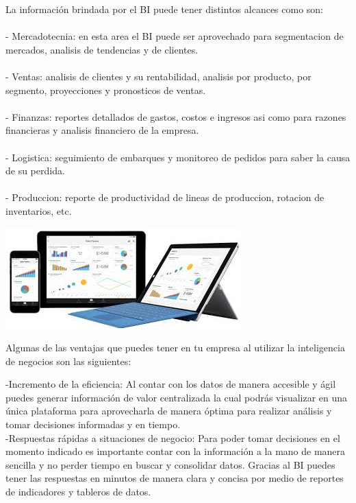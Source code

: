 \begin{enumerate}[2.]
La información brindada por el BI puede tener distintos alcances como son:\\
\\- Mercadotecnia: en esta area el BI puede ser aprovechado para segmentacion de mercados, analisis de tendencias y de clientes.\\
\\- Ventas: analisis de clientes y su rentabilidad, analisis por producto, por segmento, proyecciones y pronosticos de ventas.\\
\\- Finanzas: reportes detallados de gastos, costos e ingresos asi como para razones financieras y analisis financiero de la empresa.\\
\\- Logistica: seguimiento de embarques y monitoreo de pedidos para saber la causa de su perdida.\\
\\- Produccion: reporte de productividad de lineas de produccion, rotacion de inventarios, etc.\\




\end{enumerate}

\begin{center}
\includegraphics[scale=0.90]{./Imagenes/1.png}
\end{center}

Algunas de las ventajas que puedes tener en tu empresa al utilizar la inteligencia de negocios son las siguientes: 

-Incremento de la eficiencia: Al contar con los datos de manera accesible y ágil puedes generar información de valor centralizada la cual podrás visualizar en una única plataforma para aprovecharla de manera óptima para realizar análisis y tomar decisiones informadas y en tiempo.\\

-Respuestas rápidas a situaciones de negocio: Para poder tomar decisiones en el momento indicado es importante contar con la información a la mano de manera sencilla y no perder tiempo en buscar y consolidar datos. Gracias al BI puedes tener las respuestas en minutos de manera clara y concisa por medio de reportes de indicadores y tableros de datos.\\

